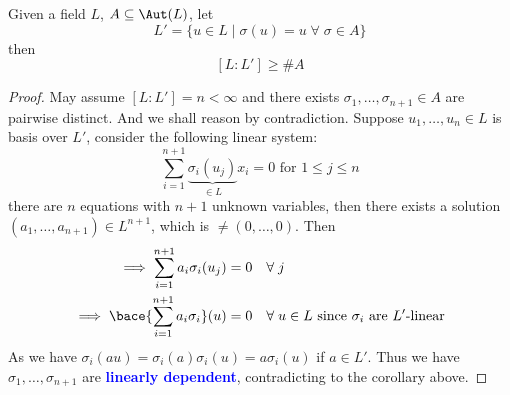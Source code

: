 \begin{proposition}
	\label{prop:lowerbound-automorphisms}
	Given a field \( L \), \( A \subseteq \Aut(L) \), let
	\[
		L' = \{u\in L \; | \; \sigma (u) = u \; \forall \; \sigma  \in A\}
	\]
	then
	\[
		[L: L'] \geq \# A
	\]
\end{proposition}

\begin{proof}
	May assume \( [L: L'] = n < \infty\) and there exists \( \sigma_1,\ldots,
	\sigma_{n+1} \in A \) are pairwise distinct. And we shall reason by contradiction. Suppose \(
	u_1,\ldots, u_n \in L \) is basis over \( L' \), consider the following linear system:
	\[
		\sum_{i=1}^{n+1} \underbrace{\sigma_i (u_j)}_{\in L} x_i = 0 \text{ for } 1 \leq j \leq n
	\]
	there are \( n \) equations with \( n+1 \) unknown variables, then there exists a solution \(
	(a_1,\ldots, a_{n+1}) \in L^{n+1} \), which is \( \ne (0,\ldots,0) \). Then
	\[
		\begin{aligned}
			\implies \sum_{i=1}^{n+1} a_i \sigma_i (u_j)      & = 0 \quad \forall \; j                      \\
			\implies \bace{\sum_{i=1}^{n+1} a_i \sigma_i} (u) & = 0 \quad \forall \; u \in L \text{ since }
			\sigma_i \text{ are } L'\text{-linear}
		\end{aligned}
	\]
	As we have \( \sigma_i (au) = \sigma_i (a)\sigma_i (u) = a\sigma_i(u) \) if \( a\in L' \).
	Thus we have \( \sigma_1,\ldots, \sigma_{n+1} \) are \textbf{\textcolor{blue}{linearly
			dependent}},
	contradicting to the corollary above.
\end{proof}
